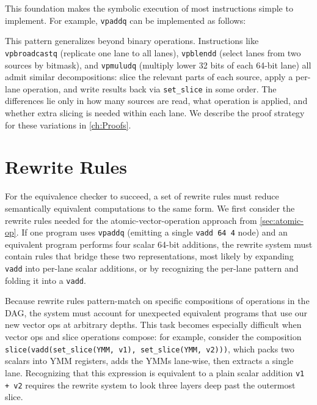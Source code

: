 This foundation makes the symbolic execution of most instructions simple to implement.
For example, \texttt{vpaddq} can be implemented as follows:


This pattern generalizes beyond binary operations.
Instructions like \texttt{vpbroadcastq} (replicate one lane to all lanes), \texttt{vpblendd} (select lanes from two sources by bitmask), and \texttt{vpmuludq} (multiply lower 32 bits of each 64-bit lane) all admit similar decompositions: slice the relevant parts of each source, apply a per-lane operation, and write results back via \texttt{set\_slice} in some order.
The differences lie only in how many sources are read, what operation is applied, and whether extra slicing is needed within each lane.
We describe the proof strategy for these variations in \autoref{ch:Proofs}.


\section{Rewrite Rules}
\label{sec:rewriting}

For the equivalence checker to succeed, a set of rewrite rules must reduce semantically equivalent computations to the same form.
We first consider the rewrite rules needed for the atomic-vector-operation approach from \autoref{sec:atomic-op}.
If one program uses \texttt{vpaddq} (emitting a single \texttt{vadd 64 4} node) and an equivalent program performs four scalar 64-bit additions, the rewrite system must contain rules that bridge these two representations, most likely by expanding \texttt{vadd} into per-lane scalar additions, or by recognizing the per-lane pattern and folding it into a \texttt{vadd}.

Because rewrite rules pattern-match on specific compositions of operations in the DAG, the system must account for unexpected equivalent programs that use our new vector ops at arbitrary depths.
This task becomes especially difficult when vector ops and slice operations compose: for example, consider the composition \texttt{slice(vadd(set_slice(YMM, v1), set_slice(YMM, v2)))}, which packs two scalars into YMM registers, adds the YMMs lane-wise, then extracts a single lane.
Recognizing that this expression is equivalent to a plain scalar addition \texttt{v1 + v2} requires the rewrite system to look three layers deep past the outermost slice.

